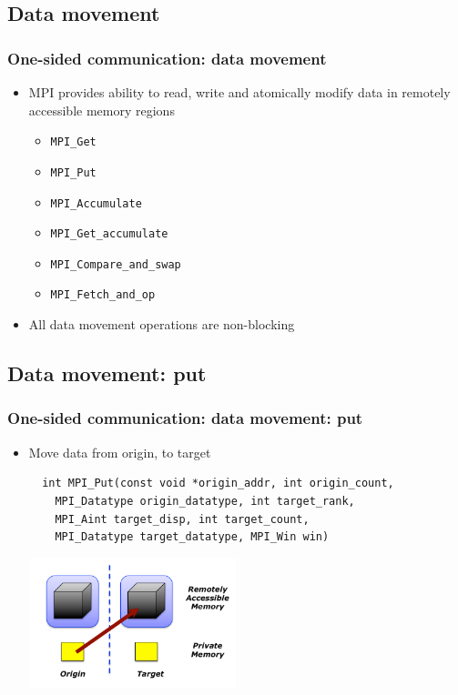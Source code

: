 \documentclass{beamer}
\begin{document}
\subsection{Data movement}
\begin{frame}[fragile]
  \frametitle{One-sided communication: data movement}
\begin{itemize}
\item MPI provides ability to read, write
and atomically modify data in
remotely accessible memory
regions
\begin{itemize}
\item {\color{mycolorcode}\verb|MPI_Get|}
\item {\color{mycolorcode}\verb|MPI_Put|}
\item {\color{mycolorcode}\verb|MPI_Accumulate|}
\item {\color{mycolorcode}\verb|MPI_Get_accumulate|}
\item {\color{mycolorcode}\verb|MPI_Compare_and_swap|}
\item {\color{mycolorcode}\verb|MPI_Fetch_and_op|}
\end{itemize}
\item All data movement operations are non-blocking
\end{itemize}
\end{frame}

\subsection{Data movement: put}
\begin{frame}[fragile]
  \frametitle{One-sided communication: data movement: put}
\begin{itemize}
\item Move data from origin, to target
{\color{mycolorcode}
\begin{verbatim}
  int MPI_Put(const void *origin_addr, int origin_count,
    MPI_Datatype origin_datatype, int target_rank,
    MPI_Aint target_disp, int target_count,
    MPI_Datatype target_datatype, MPI_Win win)
\end{verbatim}
}
\includegraphics[width=6.0cm]{graphs/put.png}
\end{itemize}
\end{frame}
\end{document}
